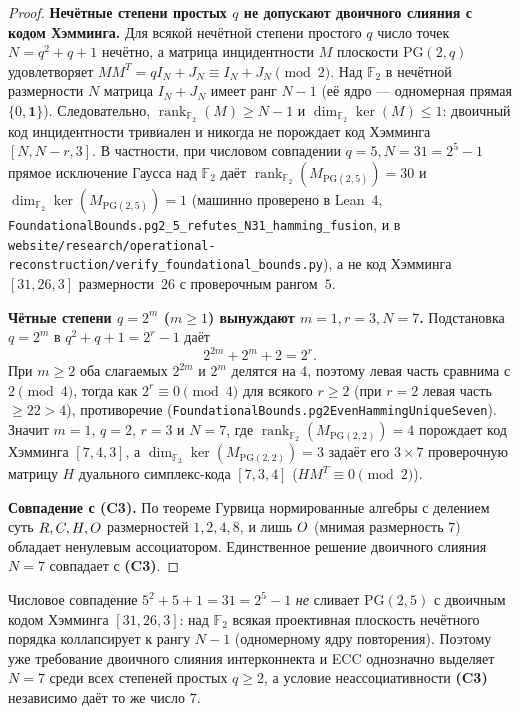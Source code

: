 \begin{proof}
\textbf{Нечётные степени простых $q$ не допускают двоичного слияния с кодом Хэмминга.}
Для всякой нечётной степени простого $q$ число точек $N=q^2+q+1$ нечётно, а
матрица инцидентности $M$ плоскости $\mathrm{PG}(2,q)$ удовлетворяет
$MM^T = q I_N + J_N \equiv I_N + J_N \pmod 2$. Над $\mathbb{F}_2$ в нечётной
размерности $N$ матрица $I_N+J_N$ имеет ранг $N-1$ (её ядро --- одномерная
прямая $\{0, \mathbf{1}\}$). Следовательно, $\operatorname{rank}_{\mathbb{F}_2}(M)\ge N-1$
и $\dim_{\mathbb{F}_2}\ker(M)\le 1$: двоичный код инцидентности тривиален и
никогда не порождает код Хэмминга $[N, N-r, 3]$. В частности, при числовом
совпадении $q=5, N=31=2^5-1$ прямое исключение Гаусса над $\mathbb{F}_2$ даёт
$\operatorname{rank}_{\mathbb{F}_2}(M_{\mathrm{PG}(2,5)})=30$ и
$\dim_{\mathbb{F}_2}\ker(M_{\mathrm{PG}(2,5)})=1$ (машинно проверено в Lean~4,
\texttt{FoundationalBounds.pg2\_5\_refutes\_N31\_hamming\_fusion}, и в
\texttt{website/research/operational-reconstruction/verify\_foundational\_bounds.py}),
а не код Хэмминга $[31,26,3]$ размерности~$26$ с проверочным рангом~$5$.

\textbf{Чётные степени $q=2^m$ ($m\ge 1$) вынуждают $m=1, r=3, N=7$.}
Подстановка $q=2^m$ в $q^2+q+1=2^r-1$ даёт
\[
2^{2m}+2^m+2 = 2^r.
\]
При $m\ge 2$ оба слагаемых $2^{2m}$ и $2^m$ делятся на $4$, поэтому левая часть
сравнима с $2\pmod 4$, тогда как $2^r\equiv 0\pmod 4$ для всякого $r\ge 2$ (при
$r=2$ левая часть $\ge 22 > 4$), противоречие
(\texttt{FoundationalBounds.pg2EvenHammingUniqueSeven}). Значит $m=1$, $q=2$,
$r=3$ и $N=7$, где $\operatorname{rank}_{\mathbb{F}_2}(M_{\mathrm{PG}(2,2)})=4$
порождает код Хэмминга $[7,4,3]$, а $\dim_{\mathbb{F}_2}\ker(M_{\mathrm{PG}(2,2)})=3$
задаёт его $3\times 7$ проверочную матрицу $H$ дуального симплекс-кода $[7,3,4]$
($HM^T\equiv 0\pmod 2$).

\textbf{Совпадение с (C3).} По теореме Гурвица нормированные алгебры с делением
суть $R,C,H,O$ размерностей $1,2,4,8$, и лишь
$O$ (мнимая размерность $7$) обладает ненулевым ассоциатором. Единственное
решение двоичного слияния $N=7$ совпадает с \textbf{(C3)}.
\end{proof}

\begin{remark}[При $N=31$ слияние не возникает]
Числовое совпадение $5^2+5+1=31=2^5-1$ \emph{не} сливает $\mathrm{PG}(2,5)$ с
двоичным кодом Хэмминга $[31,26,3]$: над $\mathbb{F}_2$ всякая проективная
плоскость нечётного порядка коллапсирует к рангу $N-1$ (одномерному ядру
повторения). Поэтому уже требование двоичного слияния интерконнекта и ECC
однозначно выделяет $N=7$ среди всех степеней простых $q\ge 2$, а условие
неассоциативности \textbf{(C3)} независимо даёт то же число $7$.
\end{remark}

